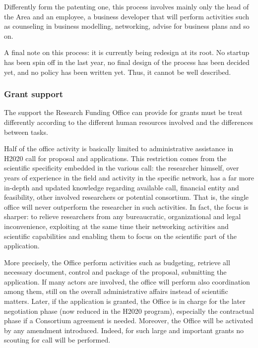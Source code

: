 Differently form the patenting one, this process involves mainly only the head of the Area and an employee, a business developer that will perform activities such as counseling in business modelling, networking, advise for business plans and so on. 

A final note on this process: it is currently being redesign at its root. No startup has been spin off in the last year, no final design of the process has been decided yet, and no policy has been written yet. Thus, it cannot be well described. 

\subsubsection{Grant support}

The support the Research Funding Office can provide for grants must be treat differently according to the different human resources involved and the differences between tasks.

Half of the office activity is basically limited to administrative assistance in H2020 call for proposal and applications. This restriction comes from the scientific specificity embedded in the various call: the researcher himself, over years of experience in the field and activity in the specific network, has a far more in-depth and updated knowledge regarding available call, financial entity and feasibility, other involved researchers or potential consortium. That is, the single office will never outperform the researcher in such activities. In fact, the focus is sharper: to relieve researchers from any bureaucratic, organizational and legal inconvenience, exploiting at the same time their networking activities and scientific capabilities and enabling them to focus on the scientific part of the application.

More precisely, the Office perform activities such as budgeting, retrieve all necessary document, control and package of the proposal, submitting the application. If many actors are involved, the office will perform also coordination among them, still on the overall administrative affairs instead of scientific matters. Later, if the application is granted, the Office is in charge for the later negotiation phase (now reduced in the H2020 program), especially the contractual phase if a Consortium agreement is needed. Moreover, the Office will be activated by any amendment introduced. Indeed, for such large and important grants no scouting for call will be performed. 

